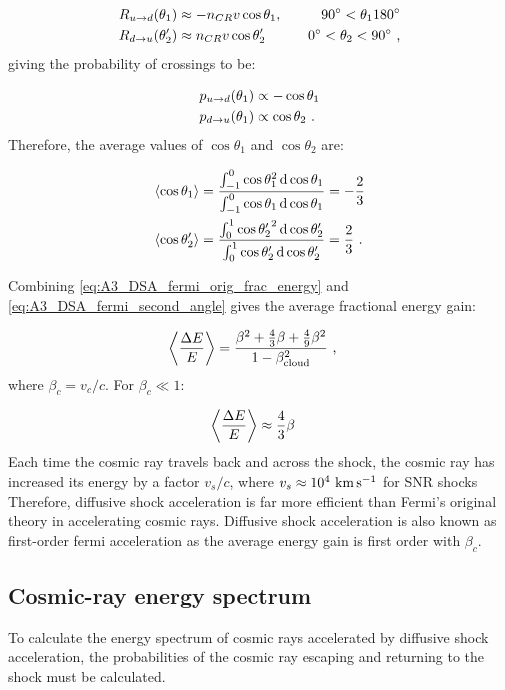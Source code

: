 \begin{alignat}{2}
    R_{u\rightarrow d}\qty(\theta_1)&\approx-n_{CR}v\cos\theta_1,\quad &\ang{90}<\theta_1\ang{180} \\
    R_{d\rightarrow u}\qty(\theta_2')&\approx n_{CR}v\cos\theta_2'\quad&\ang{0}<\theta_2<\ang{90} \text{ ,}
\end{alignat}
\noindent giving the probability of crossings to be:

\begin{equation}
    \begin{aligned}
        p_{u\rightarrow d}\qty(\theta_1)&\propto -\cos\theta_1 \\
        p_{d\rightarrow u}\qty(\theta_1)&\propto \cos\theta_2  \text{ .}
    \end{aligned}
\end{equation}
\noindent Therefore, the average values of $\cos\theta_1$ and $\cos\theta_2$ are:

\begin{equation}
    \begin{aligned}
    \left\langle \cos\theta_1 \right\rangle&=\frac{\int_{-1}^{0} \cos\theta_1^2\dd{\cos\theta_1}}{\int_{-1}^{0}\cos\theta_1 \dd{\cos\theta_1}}=-\frac{2}{3} \\
    \left\langle \cos\theta_2' \right\rangle&=\frac{\int_{0}^{1} {\cos\theta_2'}^2\dd{\cos\theta_2'}}{\int_{0}^{1}\cos\theta_2' \dd{\cos\theta_2'}}=\frac{2}{3}\text{ .}
    \end{aligned} \label{eq:A3_DSA_fermi_second_angle}
\end{equation}

\noindent Combining \autoref{eq:A3_DSA_fermi_orig_frac_energy} and \autoref{eq:A3_DSA_fermi_second_angle} gives the average fractional energy gain:

\begin{equation}
    \begin{aligned}
    \left\langle \frac{\Delta E}{E} \right\rangle
	&=\frac{\beta^2+\frac{4}{3}\beta+\frac{4}{9}\beta^2}{1-\beta_\text{cloud}^2}\text{ ,}
    \end{aligned} 
\end{equation}
\noindent where $\beta_c=v_c/c$. For $\beta_c\ll 1$:

\begin{equation}
    \begin{aligned}
    \left\langle \frac{\Delta E}{E} \right\rangle
	&\approx \frac{4}{3}\beta 
    \end{aligned} 
\end{equation}
\noindent Each time the cosmic ray travels back and across the shock, the cosmic ray has increased its energy by a factor $v_s/c$, where $v_s\approx 10^4~\si{\kilo\meter\per\second}$ for SNR shocks Therefore, diffusive shock acceleration is far more efficient than Fermi's original theory in accelerating cosmic rays.  Diffusive shock acceleration is also known as first-order fermi acceleration as the average energy gain is first order with $\beta_c$. 

\subsection{Cosmic-ray energy spectrum}

To calculate the energy spectrum of cosmic rays accelerated by diffusive shock acceleration, the probabilities of the cosmic ray escaping and returning to the shock must be calculated. 